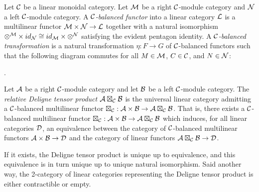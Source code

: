 \documentclass{amsart}
\begin{document}


\begin{definition}
	Let $\mathcal C$ be a linear monoidal category. 
	Let $\mathcal M$ be a right $\mathcal C$-module category and $\mathcal N$ a left $\mathcal C$-module category. A {\em $\mathcal C$-balanced functor} into a linear category $\mathcal L$ is a multilinear functor $\mathcal M \times \mathcal N \to \mathcal L$ together with a natural isomorphism $\otimes^{\mathcal M} \times id_{\mathcal N} \cong id_{\mathcal M} \times \otimes^{\mathcal N}$ satisfying the evident pentagon identity. A {\em $\mathcal C$-balanced transformation} is a natural transformation $\eta:F \to G$ of $\mathcal C$-balanced functors such that the following diagram commutes for all $M \in \mathcal M$, $C \in \mathcal C$, and $N \in \mathcal N$:
\begin{center}
.
\end{center}
\end{definition}


\begin{definition}
	Let $\mathcal A$ be a right $\mathcal C$-module category and let $\mathcal B$ be a left $\mathcal C$-module category. The {\em relative Deligne tensor product $\mathcal A \boxtimes_{\mathcal C} \mathcal B$} is the universal linear category admitting a $\mathcal C$-balanced multilinear functor $\boxtimes_{\mathcal C}: \mathcal A \times \mathcal B \to \mathcal A \boxtimes_{\mathcal C} \mathcal B$. That is, there exists a $\mathcal C$-balanced multilinear functor $\boxtimes_{\mathcal C}: \mathcal A \times \mathcal B \to \mathcal A \boxtimes_{\mathcal C} \mathcal B$ which induces, for all linear categories $\mathcal D$, an equivalence between the category of $\mathcal C$-balanced multilinear functors $\mathcal A \times \mathcal B \to \mathcal D$ and the category of linear functors $\mathcal A \boxtimes_{\mathcal C} \mathcal B \to \mathcal D$. 
\end{definition}

If it exists, the Deligne tensor product is unique up to equivalence, and this equivalence is in turn unique up to unique natural isomorphism. Said another way, the 2-category of linear categories representing the Deligne tensor product is either contractible or empty. 
\end{document}
